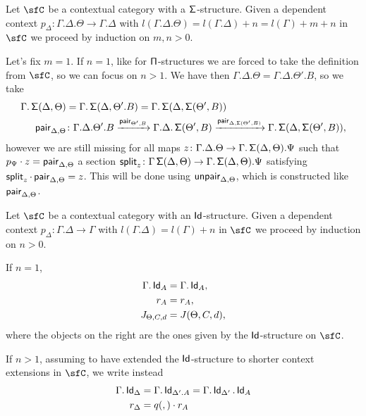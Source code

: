\begin{construction}
  Let $\sfC$ be a contextual category with a $\operatorname{\mathsf{\Sigma}}$-structure. Given a
  dependent context $p_\Delta\colon\Gamma.\Delta.\Theta\rightarrow\Gamma.\Delta$
  with $l(\Gamma.\Delta.\Theta)=l(\Gamma.\Delta)+n=l(\Gamma)+m+n$ in $\sfC$ we
  proceed by induction on $m,n>0$.

  Let's fix $m=1$. If $n=1$, like for $\operatorname{\mathsf{\Pi}}$-structures we are forced to take
  the definition from $\sfC$, so we can focus on $n>1$. We have then
  $\Gamma.\Delta.\Theta=\Gamma.\Delta.\Theta'.B$, so we take
  \begin{align*}
    \Gamma.\operatorname{\mathsf{\Sigma}}(\Delta,\Theta)
    &=\Gamma.\operatorname{\mathsf{\Sigma}}(\Delta,\Theta'.B)
    =\Gamma.\operatorname{\mathsf{\Sigma}}(\Delta,\operatorname{\mathsf{\Sigma}}(\Theta',B)) \\
    \operatorname{\mathsf{pair}}_{\Delta,\Theta}
    &\colon
    \Gamma.\Delta.\Theta'.B
    \xrightarrow{\operatorname{\mathsf{pair}}_{\Theta',B}}
    \Gamma.\Delta.\operatorname{\mathsf{\Sigma}}(\Theta',B)
    \xrightarrow{\operatorname{\mathsf{pair}}_{\Delta,\operatorname{\mathsf{\Sigma}}(\Theta',B)}}
    \Gamma.\operatorname{\mathsf{\Sigma}}(\Delta,\operatorname{\mathsf{\Sigma}}(\Theta',B)),
  \end{align*}
  however we are still missing for all maps
  $z\colon\Gamma.\Delta.\Theta\rightarrow\Gamma.\operatorname{\mathsf{\Sigma}}(\Delta,\Theta).\Psi$
  such that $p_\Psi\cdot z=\operatorname{\mathsf{pair}}_{\Delta,\Theta}$ a section
  $\operatorname{\mathsf{split}}_z\colon\Gamma\operatorname{\mathsf{\Sigma}}(\Delta,\Theta)
  \rightarrow\Gamma.\operatorname{\mathsf{\Sigma}}(\Delta,\Theta).\Psi$ satisfying
  $\operatorname{\mathsf{split}}_z\cdot\operatorname{\mathsf{pair}}_{\Delta,\Theta}=z$. This will be done using
  $\operatorname{\mathsf{unpair}}_{\Delta,\Theta}$, which is constructed like $\operatorname{\mathsf{pair}}_{\Delta,\Theta}$.
\end{construction}

\begin{construction}
  Let $\sfC$ be a contextual category with an $\operatorname{\mathsf{Id}}$-structure. Given a dependent
  context $p_\Delta\colon\Gamma.\Delta\rightarrow\Gamma$ with
  $l(\Gamma.\Delta)=l(\Gamma)+n$ in $\sfC$ we proceed by induction on $n>0$.

  If $n=1$,
  \begin{align*}
    \Gamma.\operatorname{\mathsf{Id}}_A &=\Gamma.\operatorname{\mathsf{Id}}_A, \\
    r_A &=r_A, \\
    J_{\Theta,C,d} &=J(\Theta,C,d),
  \end{align*}
  where the objects on the right are the ones given by the $\operatorname{\mathsf{Id}}$-structure on
  $\sfC$.

  If $n>1$, assuming to have extended the $\operatorname{\mathsf{Id}}$-structure to shorter context
  extensions in $\sfC$, we write instead
  \begin{align*}
    \Gamma.\operatorname{\mathsf{Id}}_{\Delta} &=\Gamma.\operatorname{\mathsf{Id}}_{\Delta'.A}=\Gamma.\operatorname{\mathsf{Id}}_{\Delta'}.\operatorname{\mathsf{Id}}_A \\
    r_{\Delta} &= q(,)\cdot r_A
  \end{align*}
\end{construction}


